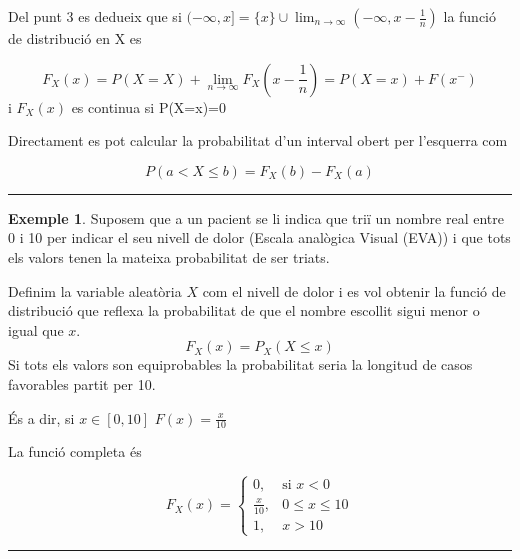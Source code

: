 \documentclass[
  catalan,
]{article}
\theoremstyle{definition}
\theoremstyle{definition}
\newtheorem{example}{Exemple}[section]
\theoremstyle{definition}
\theoremstyle{definition}
\theoremstyle{remark}
\begin{document}
Del punt 3 es dedueix que si \((- \infty,x] =\{ x \} \cup \lim_{n \rightarrow  \infty} (- \infty, x-\frac{1}{n} )\) la funció de distribució en X es

\[
F_X(x)= P(X=X)+ \lim_{n \rightarrow \infty} F_X(x-\frac{1}{n})=P(X=x) +F(x^-)
\]
i \(F_X(x)\) es continua si P(X=x)=0

Directament es pot calcular la probabilitat d'un interval obert per l'esquerra com

\[
P(a< X \leq b)=F_X(b)- F_X(a)
\]

\begin{center}\rule{0.5\linewidth}{0.5pt}\end{center}

\begin{example}
Suposem que a un pacient se li indica que triï un nombre real entre 0 i 10 per indicar el seu nivell de dolor (Escala analògica Visual (EVA)) i que tots els valors tenen la mateixa probabilitat de ser triats.

Definim la variable aleatòria \(X\) com el nivell de dolor i es vol obtenir la funció de distribució que reflexa la probabilitat de que el nombre escollit sigui menor o igual que \(x\).
\[
F_X(x)=P_X(X \leq x)
\]
Si tots els valors son equiprobables la probabilitat seria la longitud de casos favorables partit per 10.

És a dir, si \(x \in [0,10]\) \(F(x)=\frac {x}{10}\)

La funció completa és

\[
F_X(x)=
\begin{cases}
0, & \text{si } x <0 \\
\frac {x}{10}, &  0 \leq x \leq 10 \\
1, & x>10
\end{cases}
\]
\end{example}

\begin{center}\rule{0.5\linewidth}{0.5pt}\end{center}
\end{document}
